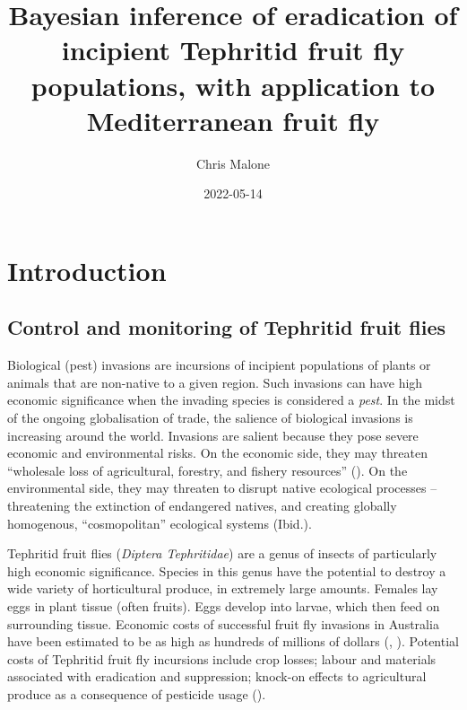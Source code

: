 \documentclass[
  oneside]{book}
\title{Bayesian inference of eradication of incipient Tephritid fruit fly populations, with application to Mediterranean fruit fly}
\author{Chris Malone}
\date{2022-05-14}
\begin{document}
\maketitle

\renewcommand{\baselinestretch}{1}\normalsize
\tableofcontents
\renewcommand{\baselinestretch}{2}\normalsize

\hypertarget{introduction}{%
\chapter{Introduction}\label{introduction}}

\hypertarget{control-and-monitoring-of-tephritid-fruit-flies}{%
\section{Control and monitoring of Tephritid fruit flies}\label{control-and-monitoring-of-tephritid-fruit-flies}}

Biological (pest) invasions are incursions of incipient populations of plants or animals that are non-native to a given region. Such invasions can have high economic significance when the invading species is considered a \emph{pest}. In the midst of the ongoing globalisation of trade, the salience of biological invasions is increasing around the world. Invasions are salient because they pose severe economic and environmental risks. On the economic side, they may threaten ``wholesale loss of agricultural, forestry, and fishery resources'' (\citet{mack2000}). On the environmental side, they may threaten to disrupt native ecological processes -- threatening the extinction of endangered natives, and creating globally homogenous, ``cosmopolitan'' ecological systems (Ibid.).

Tephritid fruit flies (\emph{Diptera Tephritidae}) are a genus of insects of particularly high economic significance. Species in this genus have the potential to destroy a wide variety of horticultural produce, in extremely large amounts. Females lay eggs in plant tissue (often fruits). Eggs develop into larvae, which then feed on surrounding tissue. Economic costs of successful fruit fly invasions in Australia have been estimated to be as high as hundreds of millions of dollars (\citet{suckling2016}, \citet{hancock2000}). Potential costs of Tephritid fruit fly incursions include crop losses; labour and materials associated with eradication and suppression; knock-on effects to agricultural produce as a consequence of pesticide usage (\citet{suckling2016}).
\end{document}

